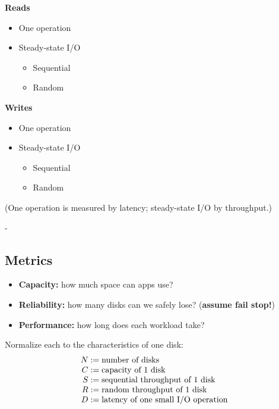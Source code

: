 \documentclass[11pt,a4paper]{article}
\makeatletter
\newcommand{\keepspace}[1]{\par\penalty-100\begingroup
  \setlength{\dimen@}{#1}\dimen@ii\pagegoal\advance\dimen@ii-\pagetotal
  \ifdim\dimen@>\dimen@ii\ifdim\dimen@ii>\z@\vfil\fi\break\fi\endgroup}
\makeatother
\begin{document}
\begin{center}
\begin{minipage}[t]{0.4\textwidth}
\textbf{Reads}
\begin{itemize}
  \item One operation
  \item Steady-state I/O
  \begin{itemize}
    \item Sequential
    \item Random
  \end{itemize}
\end{itemize}
\end{minipage}\hspace{2em}
\begin{minipage}[t]{0.4\textwidth}
\textbf{Writes}
\begin{itemize}
  \item One operation
  \item Steady-state I/O
  \begin{itemize}
    \item Sequential
    \item Random
  \end{itemize}
\end{itemize}
\end{minipage}
\end{center}

(One operation is measured by latency; steady-state I/O by throughput.)

\keepspace{9\baselineskip}
\subsection{Metrics}

\begin{defbox}
\begin{itemize}
  \item \textbf{Capacity:} how much space can apps use?
  \item \textbf{Reliability:} how many disks can we safely lose?
        (\textbf{assume fail stop!})
  \item \textbf{Performance:} how long does each workload take?
\end{itemize}
Normalize each to the characteristics of one disk:
\[
\begin{array}{r@{\;:=\;}l}
  N & \text{number of disks} \\
  C & \text{capacity of 1 disk} \\
  S & \text{sequential throughput of 1 disk} \\
  R & \text{random throughput of 1 disk} \\
  D & \text{latency of one small I/O operation}
\end{array}
\]
\end{defbox}
\end{document}
